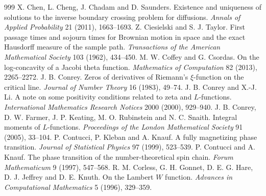 \begin{thebibliography}{999}
 X. Chen, L. Cheng, J. Chadam and D. Saunders. Existence and uniqueness of solutions to the inverse boundary crossing problem for diffusions. \emph{Annals of Applied Probability} 21 (2011), 1663--1693.
 Z. Ciesielski and S. J. Taylor. First passage times and sojourn times for Brownian motion in space and the exact Hausdorff measure of the sample path. \emph{Transactions of the American Mathematical Society} 103 (1962), 434--450.
 M. W. Coffey and G. Csordas. On the log-concavity of a Jacobi theta function. \emph{Mathematics of Computation} 82 (2013), 2265--2272.
 J. B. Conrey. Zeros of derivatives of Riemann's $\xi$-function on the critical line. \emph{Journal of Number Theory} 16 (1983), 49--74.
 J. B. Conrey and X.-J. Li. A note on some positivity conditions related to zeta and $L$-functions. \emph{International Mathematics Research Notices} 2000 (2000), 929--940.
 J. B. Conrey, D. W. Farmer, J. P. Keating, M. O. Rubinstein and N. C. Snaith. Integral moments of $L$-functions. \emph{Proceedings of the London Mathematical Society} 91 (2005), 33--104.
 P. Contucci, P. Kleban and A. Knauf. A fully magnetizing phase transition. \emph{Journal of Statistical Physics} 97 (1999), 523--539.
 P. Contucci and A. Knauf. The phase transition of the number-theoretical spin chain. \emph{Forum Mathematicum} 9 (1997), 547--568.
 R. M. Corless, G. H. Gonnet, D. E. G. Hare, D. J. Jeffrey and D. E. Knuth. On the Lambert $W$ function. \emph{Advances in Computational Mathematics} 5 (1996), 329--359.

\end{thebibliography}

